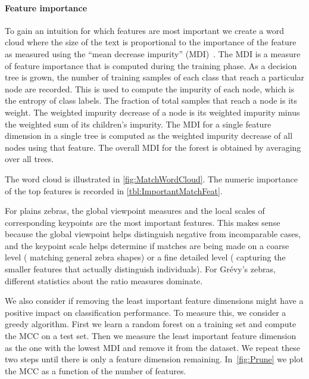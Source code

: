         \PositiveHist{}

        \PositiveROC{}


        \paragraph{Feature importance}

        To gain an intuition for which features are most important we create a word cloud where the size of the
          text is proportional to the importance of the feature as measured using the ``mean decrease impurity''
          (MDI)~\cite{louppe2014understanding}.
        The MDI is a measure of feature importance that is computed during the training phase.
        As a decision tree is grown, the number of training samples of each class that reach a particular node
          are recorded.
        This is used to compute the impurity of each node, which is the entropy of class labels.
        The fraction of total samples that reach a node is its weight.
        The weighted impurity decrease of a node is its weighted impurity minus the weighted sum of its
          children's impurity.
        The MDI for a single feature dimension in a single tree is computed as the weighted impurity decrease of
          all nodes using that feature.
        The overall MDI for the forest is obtained by averaging over all trees.

        The word cloud is illustrated in \cref{fig:MatchWordCloud}.
        The numeric importance of the top features is recorded in \cref{tbl:ImportantMatchFeat}.

        For plains zebras, the global viewpoint measures and the local scales of corresponding keypoints are the
          most important features.
        This makes sense because the global viewpoint helps distinguish negative from incomparable cases, and the
          keypoint scale helps determine if matches are being made on a coarse level (\eg{} matching general zebra
          shapes) or a fine detailed level (\ie{} capturing the smaller features that actually distinguish
          individuals).
        For Grévy's zebras, different statistics about the ratio measures dominate.

        \MatchWordCloud{}
        \ImportantMatchFeat{}


        We also consider if removing the least important feature dimensions might have a positive impact on
          classification performance.
        To measure this, we consider a greedy algorithm.
        First we learn a random forest on a training set and compute the MCC on a test set.
        Then we measure the least important feature dimension as the one with the lowest MDI and remove it from
          the dataset.
        We repeat these two steps until there is only a feature dimension remaining.
        In~\cref{fig:Prune} we plot the MCC as a function of the number of features.

